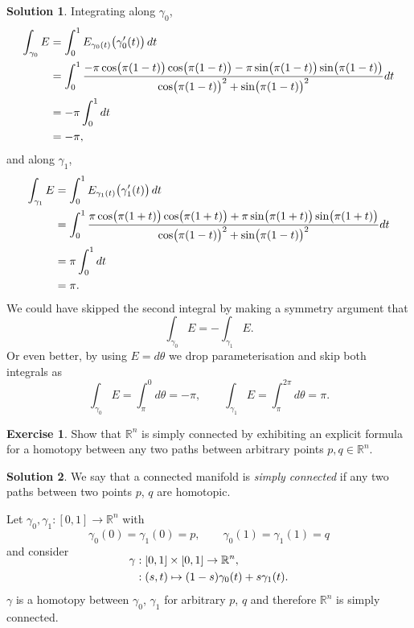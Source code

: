 \documentclass[11pt, a4paper]{report}
\theoremstyle{definition}
\newtheorem{exercise}{Exercise}[part]
\newtheorem{solution}{Solution}[part]
\newenvironment{ex}{\begin{exercise}}{\end{exercise}\pagebreak[1]}
\newenvironment{sol}{\begin{solution}}{\end{solution}\pagebreak[3]}
\renewcommand*{\d}{\ensuremath\mathop{}\mathopen{}d}
\begin{document}
\begin{sol}
Integrating along $\gamma_0$,
\begin{align*}
    \int_{\gamma_0} E &= \int_0^1 E_{\gamma_0(t)} \bigl(\gamma_0'(t) \bigr) \d t \\
        &= \int_0^1 \frac{-\pi \cos \bigl( \pi(1 - t) \bigr) \cos \bigl( \pi(1 - t) \bigr)
                          - \pi \sin \bigl( \pi(1 - t) \bigr) \sin \bigl( \pi(1 - t) \bigr)}
                         {{\cos \bigl( \pi(1 - t) \bigr)}^2 + {\sin \bigl( \pi(1 - t) \bigr)}^2} dt \\
        &= -\pi \int_0^1 dt \\
        &= -\pi,
\end{align*}
and along $\gamma_1$,
\begin{align*}
    \int_{\gamma_1} E &= \int_0^1 E_{\gamma_1(t)} \bigl(\gamma_1'(t) \bigr) \d t \\
        &= \int_0^1 \frac{\pi \cos \bigl( \pi(1 + t) \bigr) \cos \bigl( \pi(1 + t) \bigr)
                          + \pi \sin \bigl( \pi(1 + t) \bigr) \sin \bigl( \pi(1 + t) \bigr)}
                         {{\cos \bigl( \pi(1 - t) \bigr)}^2 + {\sin \bigl( \pi(1 - t) \bigr)}^2} dt \\
        &= \pi \int_0^1 dt \\
        &= \pi.
\end{align*}
We could have skipped the second integral by making a symmetry argument that
\[
    \int_{\gamma_0} E = -\int_{\gamma_1} E.
\]
Or even better, by using $E = d\theta$ we drop parameterisation and skip both integrals as
\[
    \int_{\gamma_0} E = \int_\pi^0 d\theta = -\pi, \qquad
    \int_{\gamma_1} E = \int_\pi^{2\pi} d\theta = \pi.
\]

\end{sol}

\begin{ex}

Show that $\mathbb{R}^n$ is simply connected by exhibiting an explicit formula for a homotopy between any two paths between arbitrary points $p, q \in \mathbb{R}^n$.

\end{ex}

\begin{sol}

We say that a connected manifold is \emph{simply connected} if any two paths between two points $p$, $q$ are homotopic.

Let $\gamma_0, \gamma_1: [0, 1] \to \mathbb{R}^n$ with
\[
    \gamma_0(0) = \gamma_1(0) = p, \qquad
    \gamma_0(1) = \gamma_1(1) = q
\]
and consider
\begin{align*}
    \SwapAboveDisplaySkip
    \gamma &: [0, 1] \times [0, 1] \to \mathbb{R}^n, \\
           &: (s, t) \mapsto (1 - s)\gamma_0(t) + s \gamma_1(t).
\end{align*}
$\gamma$ is a homotopy between $\gamma_0$, $\gamma_1$ for arbitrary $p$, $q$ and therefore $\mathbb{R}^n$ is simply connected.

\end{sol}
\end{document}
